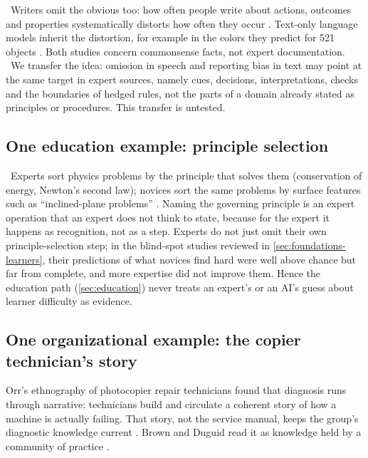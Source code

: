 \evlit\ Writers omit the obvious too: how often people write about actions,
outcomes and properties systematically distorts how often they occur
\parencite{gordon2013reporting}. Text-only language models inherit the
distortion, for example in the colors they predict for 521 objects
\parencite{paik2021world}. Both studies concern commonsense facts, not
expert documentation. \evhyp\ We transfer the idea: omission in speech and
reporting bias in text may point at the same target in expert sources,
namely cues, decisions, interpretations, checks and the boundaries of hedged
rules, not the parts of a domain already stated as principles or procedures.
This transfer is untested.

\subsection{One education example: principle selection}

\evlit\ Experts sort physics problems by the principle that solves them
(conservation of energy, Newton's second law); novices sort the same
problems by surface features such as ``inclined-plane problems''
\parencite{chi1981categorization}. Naming the governing principle is an
expert operation that an expert does not think to state, because for the
expert it happens as recognition, not as a step. Experts do not just omit
their own principle-selection step; in the blind-spot studies reviewed in
\cref{sec:foundations-learners}, their predictions of what novices find hard
were well above chance but far from complete, and more expertise did not
improve them. Hence the education path
(\cref{sec:education}) never treats an expert's or an AI's guess about
learner difficulty as evidence.

\subsection{One organizational example: the copier technician's story}

\begin{evlitbox}
  Orr's ethnography of photocopier repair technicians found that diagnosis
  runs through narrative: technicians build and circulate a coherent story
  of how a machine is actually failing. That story, not the service
  manual, keeps the group's diagnostic knowledge current
  \parencite{orr1996talking}. Brown and Duguid read it as knowledge held by a
  community of practice \parencite{brown1991organizational}.
\end{evlitbox}

